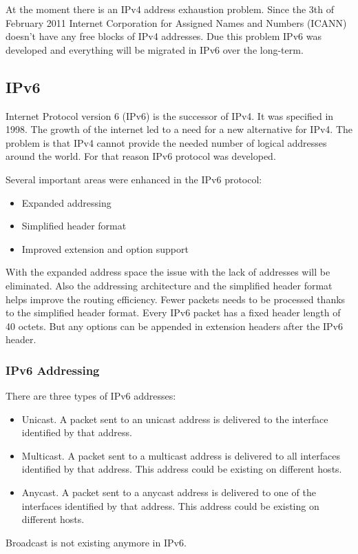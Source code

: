 \documentclass[a4paper]{report}
\begin{document}
At the moment there is an IPv4 address exhaustion problem. Since the 3th of February 2011 Internet Corporation for Assigned Names and Numbers (ICANN) doesn't have any free blocks of IPv4 addresses. Due this problem IPv6 was developed and everything will be migrated in IPv6 over the long-term. 
\subsection{IPv6}
\label{ssec:IPv6}
Internet Protocol version 6 (IPv6) is the successor of IPv4. It was specified in 1998. The growth of the internet led to a need for a new alternative for IPv4. The problem is that IPv4 cannot provide the needed number of logical addresses around the world. For that reason IPv6 protocol was developed.\parencite[11]{Babatunde2014}

Several important areas were enhanced in the IPv6 protocol:
\begin{itemize}
	\item Expanded addressing
	\item Simplified header format
	\item Improved extension and option support
\end{itemize}
With the expanded address space the issue with the lack of addresses will be eliminated. Also the addressing architecture and the simplified header format helps improve the routing efficiency. Fewer packets needs to be processed thanks to the simplified header format. 
Every IPv6 packet has a fixed header length of 40 octets. But any options can be appended in extension headers after the IPv6 header. \parencite[106-107,123-124]{Loshin2004}

\subsubsection{IPv6 Addressing}
\label{sssec:ipv6:addressing}
There are three types of IPv6 addresses:
\begin{itemize}
	\item Unicast. A packet sent to an unicast address is delivered to the interface identified by that address.
	\item Multicast. A packet sent to a multicast address is delivered to all interfaces identified by that address. This address could be existing on different hosts.
	\item Anycast. A packet sent to a anycast address is delivered to one of the interfaces identified by that address. This address could be existing on different hosts.
\end{itemize}
Broadcast is not existing anymore in IPv6. \parencite[142-143]{Loshin2004}
\end{document}
